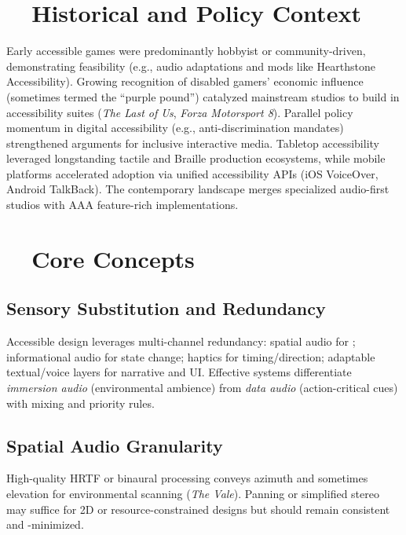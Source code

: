 \section{~~Historical and Policy Context}
\label{sec:gaming-history}
Early accessible games were predominantly hobbyist or community-driven, demonstrating feasibility (e.g., audio adaptations and mods like Hearthstone Accessibility)\supercite{AFBIntroVG}. Growing recognition of disabled gamers’ economic influence (sometimes termed the “purple pound”)\supercite{ScopeGamingReport} catalyzed mainstream studios to build in accessibility suites (\textit{The Last of Us}, \textit{Forza Motorsport 8})\supercite{LudaccessList}. Parallel policy momentum in digital accessibility (e.g., anti-discrimination mandates) strengthened arguments for inclusive interactive media. Tabletop accessibility leveraged longstanding tactile and Braille production ecosystems, while mobile platforms accelerated adoption via unified accessibility APIs (iOS VoiceOver, Android TalkBack). The contemporary landscape merges specialized audio-first studios with AAA feature-rich implementations.

\section{~~Core Concepts}
\label{sec:gaming-core-concepts}
\subsection*{Sensory Substitution and Redundancy}
Accessible design leverages multi-channel redundancy: spatial audio for ; informational audio for state change; haptics for timing/direction; adaptable textual/voice layers for narrative and UI. Effective systems differentiate \emph{immersion audio} (environmental ambience) from \emph{data audio} (action-critical cues) with mixing and priority rules.

\subsection*{Spatial Audio Granularity}
High-quality HRTF or binaural processing conveys azimuth and sometimes elevation for environmental scanning (\textit{The Vale})\supercite{AFBValeReview}. Panning or simplified stereo may suffice for 2D or resource-constrained designs but should remain consistent and -minimized.

